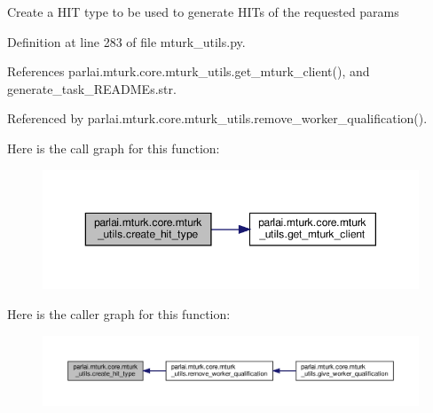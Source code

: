\begin{DoxyVerb}Create a HIT type to be used to generate HITs of the requested params\end{DoxyVerb}
 

Definition at line 283 of file mturk\+\_\+utils.\+py.



References parlai.\+mturk.\+core.\+mturk\+\_\+utils.\+get\+\_\+mturk\+\_\+client(), and generate\+\_\+task\+\_\+\+R\+E\+A\+D\+M\+Es.\+str.



Referenced by parlai.\+mturk.\+core.\+mturk\+\_\+utils.\+remove\+\_\+worker\+\_\+qualification().

Here is the call graph for this function\+:
\nopagebreak
\begin{figure}[H]
\begin{center}
\leavevmode
\includegraphics[width=350pt]{namespaceparlai_1_1mturk_1_1core_1_1mturk__utils_a2812666cca37ae0fa15e1843d3a87cd4_cgraph}
\end{center}
\end{figure}
Here is the caller graph for this function\+:
\nopagebreak
\begin{figure}[H]
\begin{center}
\leavevmode
\includegraphics[width=350pt]{namespaceparlai_1_1mturk_1_1core_1_1mturk__utils_a2812666cca37ae0fa15e1843d3a87cd4_icgraph}
\end{center}
\end{figure}
\mbox{\label{namespaceparlai_1_1mturk_1_1core_1_1mturk__utils_a2e92dde4f8ec17749f22f83b6d362d4f}} 
